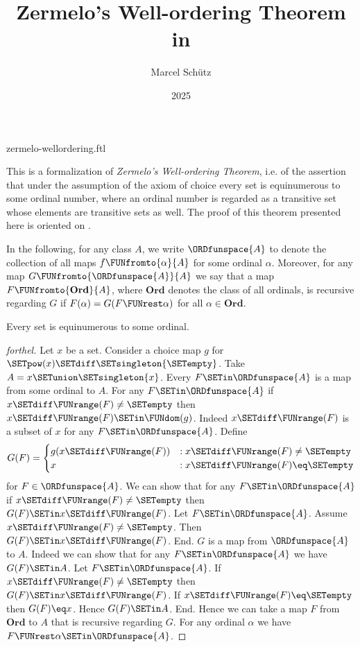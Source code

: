 \documentclass{stex}
\title{Zermelo's Well-ordering Theorem in \Naproche}
\author{Marcel Schütz}
\date{2025}
\newcommand\Ord{\textbf{Ord}}
\begin{document}
\begin{smodule}{zermelo-wellordering.ftl}
\maketitle


\noindent This is a formalization of \textit{Zermelo's Well-ordering Theorem},
i.e. of the assertion that under the assumption of the axiom of choice every
set is equinumerous to some ordinal number, where an ordinal number is
regarded as a transitive set whose elements are transitive sets as well.
The proof of this theorem presented here is oriented on \cite{Koepke2018}.

In the following, for any class $A$, we write $\ORDfunspace{A}$ to
denote the collection of all maps $f \FUNfromto{\alpha}{A}$ for some ordinal
$\alpha$.
Moreover, for any map $G \FUNfromto{\ORDfunspace{A}}{A}$ we say that a map
$F \FUNfromto{\Ord}{A}$, where $\Ord$ denotes the class of all ordinals, is
recursive regarding $G$ if $F(\alpha) = G(F \FUNrest \alpha)$ for all
$\alpha \in \Ord$.

\begin{theorem}[forthel,title=Zermelo's Well-Ordering Theorem,id=zermelo]
  Every set is equinumerous to some ordinal.
\end{theorem}
\begin{proof}[forthel]
  Let $x$ be a set.
  Consider a choice map $g$ for $\SETpow(x) \SETdiff \SETsingleton{\SETempty}$.
  Take $A = x \SETunion \SETsingleton{x}$.
  Every $F \SETin \ORDfunspace{A}$ is a map from some ordinal to $A$.
  For any $F \SETin \ORDfunspace{A}$ if $x \SETdiff \FUNrange(F) \neq \SETempty$ then $x \SETdiff \FUNrange(F) \SETin \FUNdom(g)$.
  Indeed $x \SETdiff \FUNrange(F)$ is a subset of $x$ for any $F \SETin \ORDfunspace{A}$.
  Define \[ G(F) =
    \begin{cases}
      g(x \SETdiff \FUNrange(F))
      & : x \SETdiff \FUNrange(F) \neq \SETempty
      \\
      x
      & : x \SETdiff \FUNrange(F) \eq \SETempty
    \end{cases} \]
  for $F \in \ORDfunspace{A}$.
  We can show that for any $F \SETin \ORDfunspace{A}$ if $x \SETdiff \FUNrange(F) \neq \SETempty$ then $G(F) \SETin x \SETdiff \FUNrange(F)$.
    Let $F \SETin \ORDfunspace{A}$.
    Assume $x \SETdiff \FUNrange(F) \neq \SETempty$.  
    Then $G(F) \SETin x \SETdiff \FUNrange(F)$.
  End.
  $G$ is a map from $\ORDfunspace{A}$ to $A$.
  Indeed we can show that for any $F \SETin \ORDfunspace{A}$ we have $G(F) \SETin A$.
    Let $F \SETin \ORDfunspace{A}$.
    If $x \SETdiff \FUNrange(F) \neq \SETempty$ then $G(F) \SETin x \SETdiff \FUNrange(F)$.
    If $x \SETdiff \FUNrange(F) \eq \SETempty$ then $G(F) \eq x$.
    Hence $G(F) \SETin A$.
  End.
  Hence we can take a map $F$ from $\Ord$ to $A$ that is recursive regarding $G$.
  For any ordinal $\alpha$ we have $F \FUNrest \alpha \SETin \ORDfunspace{A}$.


\end{proof}
\end{smodule}
\end{document}
